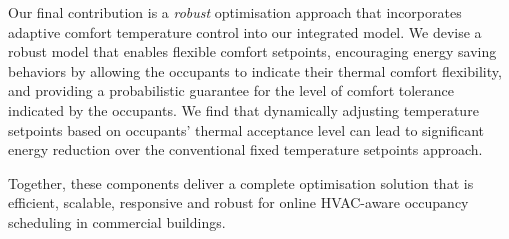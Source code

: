 Our final contribution is a \textsl{robust} optimisation approach that incorporates adaptive comfort temperature control into our integrated model. We devise a robust model that enables flexible comfort setpoints, encouraging energy saving behaviors by allowing the occupants to indicate their thermal comfort flexibility, and providing a probabilistic guarantee for the level of comfort tolerance indicated by the occupants. We find that dynamically adjusting temperature setpoints based on occupants' thermal acceptance level can lead to significant energy reduction over the conventional fixed temperature setpoints approach.

Together, these components deliver a complete optimisation solution that is efficient, scalable, responsive and robust for online HVAC-aware occupancy scheduling in commercial buildings. 





